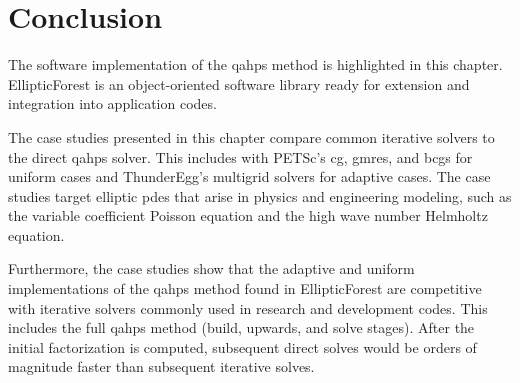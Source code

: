\section{Conclusion}

The software implementation of the \gls{qahps} method is highlighted in this chapter. EllipticForest is an object-oriented software library ready for extension and integration into application codes.

The case studies presented in this chapter compare common iterative solvers to the direct \gls{qahps} solver. This includes with PETSc's \gls{cg}, \gls{gmres}, and \gls{bcgs} for uniform cases and ThunderEgg's multigrid solvers for adaptive cases. The case studies target elliptic \gls{pdes} that arise in physics and engineering modeling, such as the variable coefficient Poisson equation and the high wave number Helmholtz equation.

Furthermore, the case studies show that the adaptive and uniform implementations of the \gls{qahps} method found in EllipticForest are competitive with iterative solvers commonly used in research and development codes. This includes the full \gls{qahps} method (build, upwards, and solve stages). After the initial factorization is computed, subsequent direct solves would be orders of magnitude faster than subsequent iterative solves.